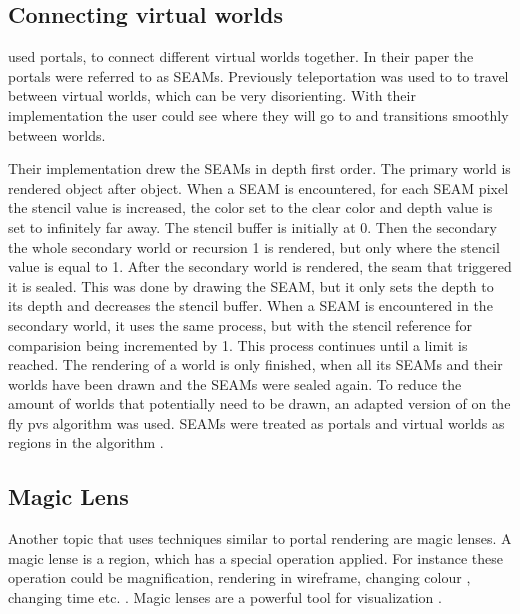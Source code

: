 
\subsection{Connecting virtual worlds}

\textcite{schmalstieg:1999:sewing} used portals, to connect different virtual worlds together. In their paper the portals were referred to as SEAMs. Previously teleportation was used to to travel between virtual worlds, which can be very disorienting. With their implementation the user could see where they will go to and transitions smoothly between worlds.


Their implementation drew the SEAMs in depth first order. The primary world is rendered object after object. When a SEAM is encountered, for each SEAM pixel  the stencil value is increased, the color set to the clear color and  depth value is set to infinitely far away. The stencil buffer is initially at 0. Then the secondary the whole secondary world or recursion 1 is rendered, but only where the stencil value is equal to 1. After the secondary world is rendered, the seam that triggered it is sealed. This was done by drawing the SEAM, but it only sets the depth to its depth and decreases the stencil buffer. When a SEAM is encountered in the secondary world, it uses the same process, but with the stencil reference for comparision being incremented by 1. This process continues until a limit is reached. The rendering of a world is only finished, when all its SEAMs and their worlds have been drawn and the SEAMs were sealed again. To reduce the amount of worlds that potentially need to be drawn,  an adapted version of \textcite{luebke:1995:portals} on the fly \gls{pvs} algorithm was used. SEAMs were treated as portals and virtual worlds as regions in the algorithm \cite{schmalstieg:1999:sewing}.

\subsection{Magic Lens}
Another topic that uses techniques similar to portal rendering are magic lenses. A magic lense is a region, which has a special operation applied. For instance these operation could be magnification, rendering in wireframe, changing colour \cite{bier:1993:toolglass}, changing time \cite{ryall:2005:temporal, tiesel:2009:composable} etc. . Magic lenses are a powerful tool for visualization  \cite{bier:1993:toolglass, tominski:2014:survey}.

